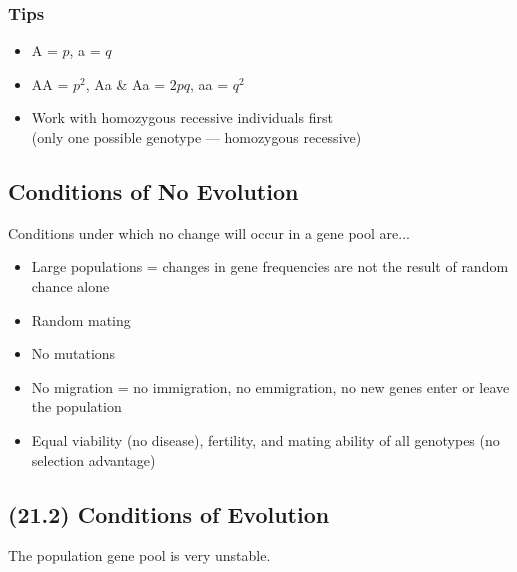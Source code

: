 \documentclass[a4paper,12pt]{article}
\begin{document}
\subsubsection{Tips}
\begin{itemize}
    \item{A = $p$, a = $q$}
    \item{AA = $p^2$, Aa \& Aa = $2pq$, aa = $q^2$}
    \item{Work with homozygous recessive individuals first \\ (only one possible genotype --- homozygous recessive)}
\end{itemize}

\subsection{Conditions of No Evolution}
Conditions under which no change will occur in a gene pool are...
\begin{itemize}
    \item{Large populations = changes in gene frequencies are not the result of random chance alone}
    \item{Random mating}
    \item{No mutations}
    \item{No migration = no immigration, no emmigration, no new genes enter or leave the population}
    \item{Equal viability (no disease), fertility, and mating ability of all genotypes (no selection advantage)}
\end{itemize}

\pagebreak

\subsection{(21.2) Conditions of Evolution} \noindent

The population gene pool is very unstable.
\end{document}
